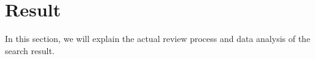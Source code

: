                 
\chapter{Result} 

\label{Chapter3} %
In this section, we will explain the actual review process and data analysis of the search result.  



